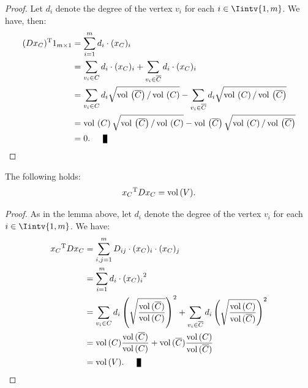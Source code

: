 \begin{proof}
   Let $d_i$ denote the degree of the vertex $v_i$ for each $i \in \Iintv{1,m}$. We have, then:
   \begin{equation*}
      \begin{split}
         (D x_C)^{\rm T} 1_{m \times 1} &= \sum_{i=1}^m d_i \cdot (x_C)_i \\
         &= \sum_{v_i \in C} d_i \cdot (x_C)_i + \sum_{v_i \in \overline C} d_i \cdot (x_C)_i \\
         &= \sum_{v_i \in C} d_i \sqrt{\vol \left( \overline C \right) / \vol \left( C \right) } - \sum_{v_i \in \overline C} d_i \sqrt{\vol \left( C \right) / \vol \left( \overline C \right) } \\
         &= \vol \left( C \right) \sqrt{\vol \left( \overline C \right) / \vol \left( C \right) } - \vol \left( \overline C \right) \sqrt{\vol \left( C \right) / \vol \left( \overline C \right) } \\
         &= 0. \qed
      \end{split}
   \end{equation*}
\end{proof}

\begin{lemma} \label{cond2}
   The following holds:
   \begin{equation}
      {x_C}^{\rm T}Dx_C = \operatorname*{vol\,} (V).
   \end{equation}
\end{lemma}

\begin{proof}
   As in the lemma above, let $d_i$ denote the degree of the vertex $v_i$ for each $i \in \Iintv{1,m}$. We have:
   \begin{equation*}
      \begin{split}
         {x_C}^{\rm T} D x_C &= \sum_{i,j=1}^m D_{ij} \cdot (x_C)_i \cdot (x_C)_j \\
         &= \sum_{i=1}^m d_i \cdot {(x_C)_i}^2 \\
         &= \sum_{v_i \in C} d_i \left( \sqrt{\frac{\vol (\overline C)}{\vol (C)}} \right)^2
         + \sum_{v_i \in \overline C} d_i \left( \sqrt{\frac{\vol (C)}{\vol (\overline C)}} \right)^2 \\
         &= \vol(C) \frac{\vol (\overline C)}{\vol(C)} + \vol(\overline C) \frac{\vol (C)}{\vol ( \overline C)} \\
         &= \vol (V). \qed
      \end{split}
   \end{equation*}
\end{proof}

